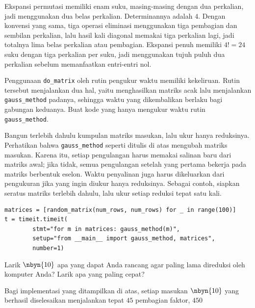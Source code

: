 \begin{exercises}
\begin{answer}
\begin{exparts}
           Ekspansi permutasi memiliki enam suku, masing-masing dengan dua
           perkalian, jadi menggunakan dua belas perkalian.
         \partsitem Determinannya adalah $4$.
           Dengan konvensi yang sama, tiga operasi eliminasi menggunakan tiga
           pembagian dan sembilan perkalian, lalu hasil kali diagonal memakai
           tiga perkalian lagi, jadi totalnya lima belas perkalian atau
           pembagian.
           Ekspansi penuh memiliki $4!=24$ suku dengan tiga perkalian per suku,
           jadi menggunakan tujuh puluh dua perkalian sebelum memanfaatkan
           entri-entri nol.
       \end{exparts}
     \end{answer}
  \item Penggunaan \lstinline[style=inline]!do_matrix! oleh rutin pengukur waktu
    memiliki kekeliruan.
    Rutin tersebut menjalankan dua hal, yaitu menghasilkan matriks acak lalu
    menjalankan \lstinline[style=inline]!gauss_method! padanya, sehingga waktu
    yang dikembalikan berlaku bagi gabungan keduanya.
    Buat kode yang hanya mengukur waktu rutin
    \lstinline[style=inline]!gauss_method!.
    \begin{answer}
      Bangun terlebih dahulu kumpulan matriks masukan, lalu ukur hanya reduksinya.
      Perhatikan bahwa \lstinline[style=inline]!gauss_method! seperti ditulis di
      atas mengubah matriks masukan. Karena itu, setiap pengulangan harus memakai
      salinan baru dari matriks awal; jika tidak, semua pengulangan setelah yang
      pertama bekerja pada matriks berbentuk eselon. Waktu penyalinan juga harus
      dikeluarkan dari pengukuran jika yang ingin diukur hanya reduksinya.
      Sebagai contoh, siapkan seratus matriks terlebih dahulu, lalu ukur setiap
      reduksi tepat satu kali.
\begin{lstlisting}
matrices = [random_matrix(num_rows, num_rows) for _ in range(100)]
t = timeit.timeit(
        stmt="for m in matrices: gauss_method(m)",
        setup="from __main__ import gauss_method, matrices",
        number=1)
\end{lstlisting}
    \end{answer}
  \item 
    Larik $\nbyn{10}$ apa yang dapat Anda rancang agar paling lama direduksi oleh
    komputer Anda? Larik apa yang paling cepat?
    \begin{answer}
      Bagi implementasi yang ditampilkan di atas, setiap masukan $\nbyn{10}$ yang
      berhasil diselesaikan menjalankan tepat $45$ pembagian faktor, $450$

\end{answer}
\end{exercises}
